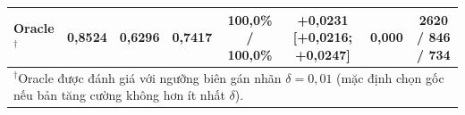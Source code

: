 \documentclass[runningheads]{llncs}
\begin{document}
\begin{table}[t]
{\begin{tabular}{l c c c c c c c}
            \midrule
            Oracle$^{\dagger}$                   & \textbf{0,8524} & \textbf{0,6296} & \textbf{0,7417} & 100,0\% / 100,0\%        & +0,0231 [+0,0216; +0,0247]          & 0,000                           & 2620 / 846 / 734             \\
            \bottomrule
            \multicolumn{8}{l}{\footnotesize $^{\dagger}$Oracle được đánh giá với ngưỡng biên gán nhãn $\delta = 0{,}01$ (mặc định chọn gốc nếu bản tăng cường không hơn ít nhất $\delta$).}
        \end{tabular}
    }
\end{table}

\begin{table}[t]
    \centering
    \caption{Hiệu năng trên 1.960 ảnh kiểm thực giữ lại và ma trận nhầm lẫn test của Bộ chọn \texttt{ce+$\tau$} trên 4.200 ảnh test.}
    \label{tab:confusion}
\end{table}
\end{document}
